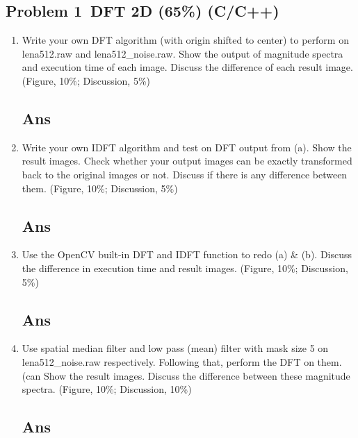 	\begin{reportsection}{-1cm}{-1cm}
		\section*{Problem 1~DFT 2D (65\%) (C/C++)}
		\begin{enumerate}[label=\alph*.]
			\item 
				Write your own DFT algorithm (with origin shifted to center) to perform on lena512.raw and
				lena512\_noise.raw. Show the output of magnitude spectra and execution time of each image.
				Discuss the difference of each result image. (Figure, 10\%; Discussion, 5\%)
				\subsection*{Ans}
				
			\item
				Write your own IDFT algorithm and test on DFT output from (a). Show the result images.
				Check whether your output images can be exactly transformed back to the original images or
				not. Discuss if there is any difference between them. (Figure, 10\%; Discussion, 5\%)
				\subsection*{Ans}

			\item
				Use the OpenCV built-in DFT and IDFT function to redo (a) \& (b). Discuss the difference in
				execution time and result images. (Figure, 10\%; Discussion, 5\%)
				\subsection*{Ans}
			
			\item	
				Use spatial median filter and low pass (mean) filter with mask size 5 on lena512\_noise.raw
				respectively. Following that, perform the DFT on them. (can Show the result images. Discuss
				the difference between these magnitude spectra. (Figure, 10\%; Discussion, 10\%)
				\subsection*{Ans}

		\end{enumerate}
	\end{reportsection}
